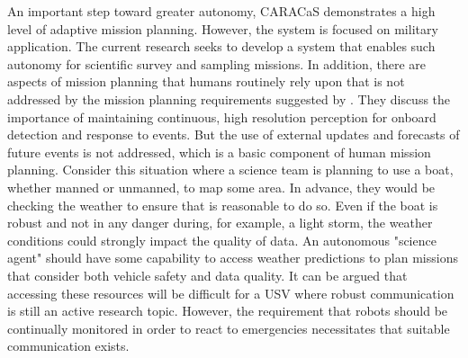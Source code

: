 \documentclass{tamuccthesis}
\begin{document}
An important step toward greater autonomy, CARACaS demonstrates a high level of adaptive mission planning. However, the system is focused on military application. The current research seeks to develop a system that enables such autonomy for scientific survey and sampling missions. In addition, there are aspects of mission planning that humans routinely rely upon that is not addressed by the mission planning requirements suggested by \cite{heo2017case}. They discuss the importance of maintaining continuous, high resolution perception for onboard detection and response to events. But the use of external updates and forecasts of future events is not addressed, which is a basic component of human mission planning. Consider this situation where a science team is planning to use a boat, whether manned or unmanned, to map some area. In advance, they would be checking the weather to ensure that is reasonable to do so. Even if the boat is robust and not in any danger during, for example, a light storm, the weather conditions could strongly impact the quality of data. An autonomous "science agent" should have some capability to access weather predictions to plan missions that consider both vehicle safety and data quality. It can be argued that accessing these resources will be difficult for a USV where robust communication is still an active research topic. However, the requirement that robots should be continually monitored in order to react to emergencies necessitates that suitable communication exists. 
\end{document}
